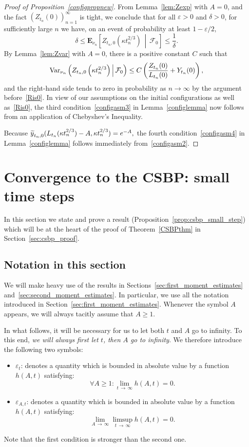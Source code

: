 \documentclass[10pt]{amsart}
\theoremstyle{definition}\newtheorem{defi}[theo]{Definition}\newtheorem{rema}[theo]{Remark}\newtheorem{exam}[theo]{Example}\newtheorem{exem}[theo]{Example}\newtheorem{nota}[theo]{Notation}
\newcommand*\eps{\varepsilon}
\newcommand*\Var{\textup{Var}}
\newcommand*\E{\mathbf{E}}
\newcommand\F{\mathcal{F}}
\newcommand{\1} {\mathds{1}}
\renewcommand*\to{\rightarrow}
\let\oldtilde\tilde
\renewcommand*{\tilde}[1]{\mathchoice{\widetilde{#1}}{\widetilde{#1}}{\oldtilde{#1}}{\oldtilde{#1}}}
\let\oldforall\forall
\renewcommand*{\forall}{\mathrel{\oldforall}}
\begin{document}
\begin{proof}[Proof of Proposition~\ref{configpropnew}]
From Lemma~\ref{lem:Zexp} with $A = 0$, and the fact $(Z_{t_n}(0))_{n=1}^{\infty}$ is tight, we conclude that for all $\eps > 0$ and $\delta > 0$, for sufficiently large $n$ we have, on an event of probability at least $1 - \eps/2$,
\[
\delta \leq \E_{\nu_n}\left[Z_{t_n,0}\left(\kappa t_n^{2/3}\right)\,\middle|\,\F_0\right] \leq \frac{1}{\delta}.
\]
By Lemma~\ref{lem:Zvar} with $A = 0$, there is a positive constant $C$ such that
\[
\Var_{\nu_n}\left(Z_{t_n,0}\left(\kappa t_n^{2/3}\right)\,\middle|\,\F_0\right) \leq C \left(\frac{Z_{t_n}(0)}{L_{t_n}(0)} + Y_{t_n}(0) \right),
\]
and the right-hand side tends to zero in probability as $n \rightarrow \infty$ by the argument before~\eqref{Ris0}. In view of our assumptions on the initial configurations as well as~\eqref{Ris0}, the third condition~\eqref{configasm3} in Lemma~\ref{configlemma} now follows from an application of Chebyshev's Inequality.

Because ${\tilde y}_{t_n,0}(L_{t_n}(\kappa t_n^{2/3}) - A, \kappa t_n^{2/3}) = e^{-A},$ the fourth condition~\eqref{configasm4} in Lemma~\ref{configlemma} follows immediately from~\eqref{configasm2}.
\end{proof}

\section{Convergence to the CSBP: small time steps}\label{CSBPsec}

In this section we state and prove a result (Proposition~\ref{prop:csbp_small_step}) which will be at the heart of the proof of Theorem~\ref{CSBPthm} in Section~\ref{sec:csbp_proof}.

\subsection{Notation in this section}

We will make heavy use of the results in Sections~\ref{sec:first_moment_estimates} and~\ref{sec:second_moment_estimates}. In particular, we use all the notation introduced in Section~\ref{sec:first_moment_estimates}. Whenever the symbol $A$ appears, we will always tacitly assume that $A\ge1$.

In what follows, it will be necessary for us to let both $t$ and $A$ go to infinity. To this end, \emph{we will always first let $t$, then $A$ go to infinity}. We therefore introduce the following two symbols:
\begin{itemize}
\item $\eps_t$: denotes a quantity which is bounded in absolute value by a function $h(A,t)$ satisfying:
\[
\forall A\ge 1: \lim_{t\,\to\,\infty} h(A,t) = 0.
\]
\item $\eps_{A,t}$: denotes a quantity which is bounded in absolute value by a function $h(A,t)$ satisfying:
\[
\lim_{A\,\to\,\infty} \limsup_{t\,\to\,\infty} h(A,t) = 0.
\]
\end{itemize}
Note that the first condition is stronger than the second one.
\end{document}
